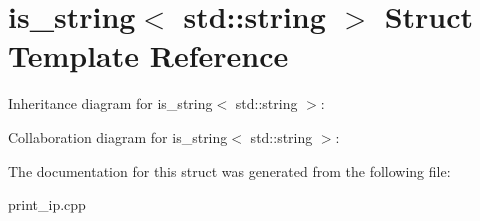 \hypertarget{structis__string_3_01std_1_1string_01_4}{}\section{is\+\_\+string$<$ std\+:\+:string $>$ Struct Template Reference}
\label{structis__string_3_01std_1_1string_01_4}


Inheritance diagram for is\+\_\+string$<$ std\+:\+:string $>$\+:


Collaboration diagram for is\+\_\+string$<$ std\+:\+:string $>$\+:


The documentation for this struct was generated from the following file\+:\begin{DoxyCompactItemize}
\item 
print\+\_\+ip.\+cpp\end{DoxyCompactItemize}
